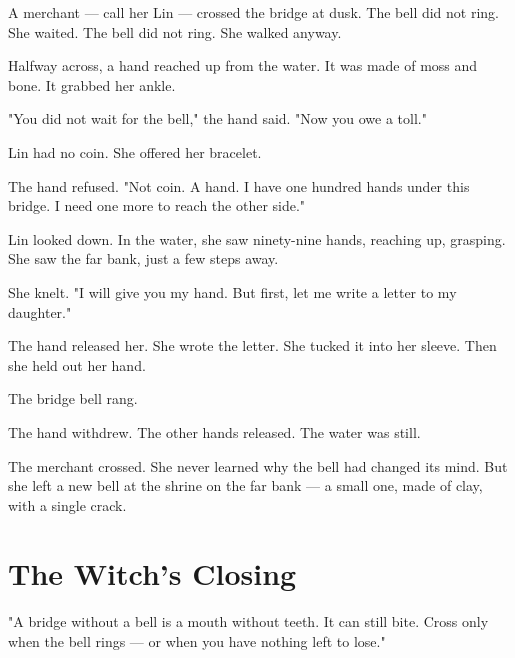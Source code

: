 \documentclass[10pt,twoside]{book}
\begin{document}
A merchant --- call her Lin --- crossed the bridge at dusk. The bell did not ring. She waited. The bell did not ring. She walked anyway.

Halfway across, a hand reached up from the water. It was made of moss and bone. It grabbed her ankle.

"You did not wait for the bell," the hand said. "Now you owe a toll."

Lin had no coin. She offered her bracelet.

The hand refused. "Not coin. A hand. I have one hundred hands under this bridge. I need one more to reach the other side."

Lin looked down. In the water, she saw ninety-nine hands, reaching up, grasping. She saw the far bank, just a few steps away.

She knelt. "I will give you my hand. But first, let me write a letter to my daughter."

The hand released her. She wrote the letter. She tucked it into her sleeve. Then she held out her hand.

The bridge bell rang.

The hand withdrew. The other hands released. The water was still.

The merchant crossed. She never learned why the bell had changed its mind. But she left a new bell at the shrine on the far bank --- a small one, made of clay, with a single crack.

\section*{The Witch's Closing}
"A bridge without a bell is a mouth without teeth. It can still bite. Cross only when the bell rings --- or when you have nothing left to lose."
\end{document}
